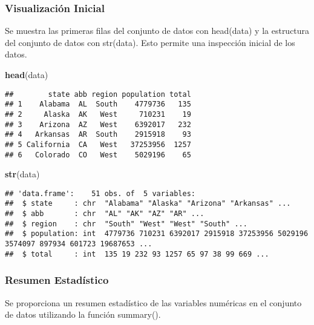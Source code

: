 \documentclass[
]{article}
\newenvironment{Shaded}{\begin{snugshade}}{\end{snugshade}}
\newcommand{\FunctionTok}[1]{\textcolor[rgb]{0.13,0.29,0.53}{\textbf{#1}}}
\newcommand{\NormalTok}[1]{#1}
\begin{document}
\hypertarget{visualizaciuxf3n-inicial}{%
\subsubsection{Visualización Inicial}\label{visualizaciuxf3n-inicial}}

Se muestra las primeras filas del conjunto de datos con head(data) y la
estructura del conjunto de datos con str(data). Esto permite una
inspección inicial de los datos.

\begin{Shaded}
\begin{Highlighting}[]
\FunctionTok{head}\NormalTok{(data)}
\end{Highlighting}
\end{Shaded}

\begin{verbatim}
##        state abb region population total
## 1    Alabama  AL  South    4779736   135
## 2     Alaska  AK   West     710231    19
## 3    Arizona  AZ   West    6392017   232
## 4   Arkansas  AR  South    2915918    93
## 5 California  CA   West   37253956  1257
## 6   Colorado  CO   West    5029196    65
\end{verbatim}

\begin{Shaded}
\begin{Highlighting}[]
\FunctionTok{str}\NormalTok{(data)}
\end{Highlighting}
\end{Shaded}

\begin{verbatim}
## 'data.frame':    51 obs. of  5 variables:
##  $ state     : chr  "Alabama" "Alaska" "Arizona" "Arkansas" ...
##  $ abb       : chr  "AL" "AK" "AZ" "AR" ...
##  $ region    : chr  "South" "West" "West" "South" ...
##  $ population: int  4779736 710231 6392017 2915918 37253956 5029196 3574097 897934 601723 19687653 ...
##  $ total     : int  135 19 232 93 1257 65 97 38 99 669 ...
\end{verbatim}

\hypertarget{resumen-estaduxedstico}{%
\subsubsection{Resumen Estadístico}\label{resumen-estaduxedstico}}

Se proporciona un resumen estadístico de las variables numéricas en el
conjunto de datos utilizando la función summary().
\end{document}
